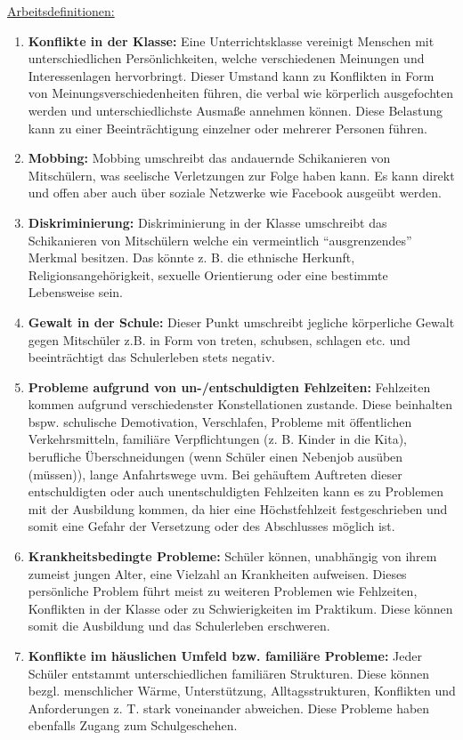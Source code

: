 \noindent
\underline{Arbeitsdefinitionen:}
\begin{enumerate}
	\item \textbf{Konflikte in der Klasse:} Eine Unterrichtsklasse vereinigt Menschen mit unterschiedlichen Persönlichkeiten, welche verschiedenen Meinungen und Interessenlagen hervorbringt. Dieser Umstand kann zu Konflikten in Form von Meinungsverschiedenheiten führen, die verbal wie körperlich ausgefochten werden und unterschiedlichste Ausmaße annehmen können. Diese Belastung kann zu einer Beeinträchtigung einzelner oder mehrerer Personen führen.
	\item \textbf{Mobbing:} Mobbing umschreibt das andauernde Schikanieren von Mitschülern, was seelische Verletzungen zur Folge haben kann. Es kann direkt und offen aber auch über soziale Netzwerke wie Facebook ausgeübt werden.
	\item \textbf{Diskriminierung:} Diskriminierung in der Klasse umschreibt das Schikanieren von Mitschülern welche ein vermeintlich "`ausgrenzendes"' Merkmal besitzen. Das könnte z. B. die ethnische Herkunft, Religionsangehörigkeit, sexuelle Orientierung oder eine bestimmte Lebensweise sein.
	\item \textbf{Gewalt in der Schule:} Dieser Punkt umschreibt jegliche körperliche Gewalt gegen Mitschüler z.B. in Form von treten, schubsen, schlagen etc. und beeinträchtigt das Schulerleben stets negativ.
	\item \textbf{Probleme aufgrund von un-/entschuldigten Fehlzeiten:} Fehlzeiten kommen aufgrund verschiedenster Konstellationen zustande. Diese beinhalten bspw. schulische Demotivation, Verschlafen, Probleme mit öffentlichen Verkehrsmitteln, familiäre Verpflichtungen (z. B. Kinder in die Kita), berufliche Überschneidungen (wenn Schüler einen Nebenjob ausüben (müssen)), lange Anfahrtswege uvm. Bei gehäuftem Auftreten dieser entschuldigten oder auch unentschuldigten Fehlzeiten kann es zu Problemen mit der Ausbildung kommen, da hier eine Höchstfehlzeit festgeschrieben und somit eine Gefahr der Versetzung oder des Abschlusses möglich ist.
	\item \textbf{Krankheitsbedingte Probleme:} Schüler können, unabhängig von ihrem zumeist jungen Alter, eine Vielzahl an Krankheiten aufweisen. Dieses persönliche Problem führt meist zu weiteren Problemen wie Fehlzeiten, Konflikten in der Klasse oder zu Schwierigkeiten im Praktikum. Diese können somit die Ausbildung und das Schulerleben erschweren.
	\item \textbf{Konflikte im häuslichen Umfeld bzw. familiäre Probleme:} Jeder Schüler entstammt unterschiedlichen familiären Strukturen. Diese können bezgl. menschlicher Wärme, Unterstützung, Alltagsstrukturen, Konflikten und Anforderungen z. T. stark voneinander abweichen. Diese Probleme haben ebenfalls Zugang zum Schulgeschehen. 

\end{enumerate}
